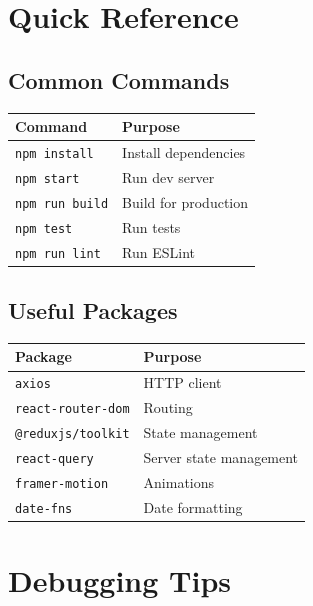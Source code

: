 \documentclass[12pt,a4paper,oneside]{article}
\begin{document}
\appendix

\section{Quick Reference}

\subsection{Common Commands}

\begin{table}[H]
\centering
\small
\begin{tabular}{|l|l|}
\hline
\textbf{Command} & \textbf{Purpose} \\
\hline
\texttt{npm install} & Install dependencies \\
\texttt{npm start} & Run dev server \\
\texttt{npm run build} & Build for production \\
\texttt{npm test} & Run tests \\
\texttt{npm run lint} & Run ESLint \\
\hline
\end{tabular}
\end{table}

\subsection{Useful Packages}

\begin{table}[H]
\centering
\small
\begin{tabular}{|l|l|}
\hline
\textbf{Package} & \textbf{Purpose} \\
\hline
\texttt{axios} & HTTP client \\
\texttt{react-router-dom} & Routing \\
\texttt{@reduxjs/toolkit} & State management \\
\texttt{react-query} & Server state management \\
\texttt{framer-motion} & Animations \\
\texttt{date-fns} & Date formatting \\
\hline
\end{tabular}
\end{table}

\section{Debugging Tips}
\end{document}
